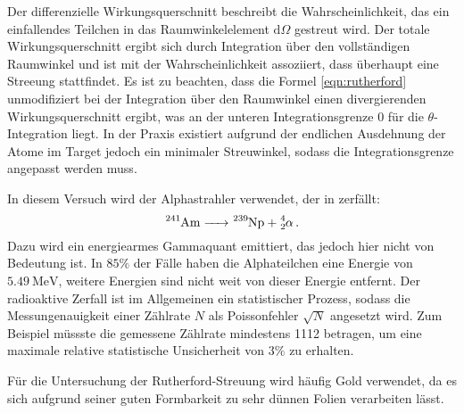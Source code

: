 Der differenzielle Wirkungsquerschnitt beschreibt die Wahrscheinlichkeit, das ein einfallendes Teilchen in das Raumwinkelelement $\mathrm{d} \Omega$ gestreut wird. Der totale Wirkungsquerschnitt ergibt sich durch Integration über den vollständigen Raumwinkel und ist mit der Wahrscheinlichkeit assoziiert, dass überhaupt eine Streeung stattfindet. Es ist zu beachten, dass die Formel \eqref{eqn:rutherford} unmodifiziert bei der Integration über den Raumwinkel einen divergierenden Wirkungsquerschnitt ergibt, was an der unteren Integrationsgrenze $0$ für die $\theta$-Integration liegt. In der Praxis existiert aufgrund der endlichen Ausdehnung der Atome im Target jedoch ein minimaler Streuwinkel, sodass die Integrationsgrenze angepasst werden muss.

In diesem Versuch wird der Alphastrahler  verwendet, der in  zerfällt:
\begin{equation*}
  \ce{^{241}Am -> ^{239}Np + ^4_2} \alpha\,.
\end{equation*}
Dazu wird ein energiearmes Gammaquant emittiert, das jedoch hier nicht von Bedeutung ist. In $85\%$ der Fälle haben die Alphateilchen eine Energie von $\SI{5.49}{\mega\electronvolt}$, weitere Energien sind nicht weit von dieser Energie entfernt. Der radioaktive Zerfall ist im Allgemeinen ein statistischer Prozess, sodass die Messungenauigkeit einer Zählrate $N$ als Poissonfehler $\sqrt{N}$ angesetzt wird. Zum Beispiel müssste die gemessene Zählrate mindestens 1112 betragen, um eine maximale relative statistische Unsicherheit von $3\%$ zu erhalten.

Für die Untersuchung der Rutherford-Streuung wird häufig Gold verwendet, da es sich aufgrund seiner guten Formbarkeit zu sehr dünnen Folien verarbeiten lässt.
